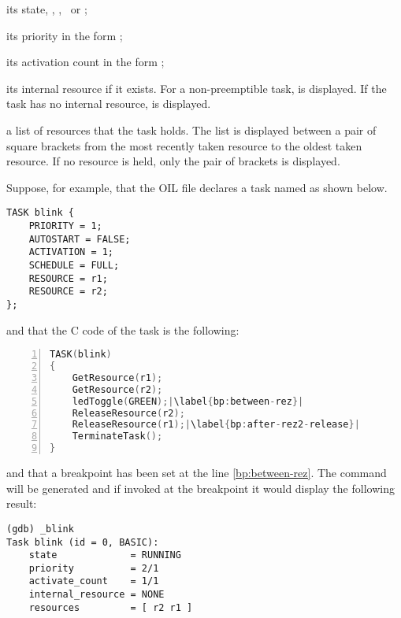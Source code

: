 \begin{pitemize}
\item its state, \SUSPENDED, \READY, \RUNNING\ or \WAITING;
\item its priority in the form ;
\item its activation count in the form ;
\item its internal resource if it exists. For a non-preemptible task,  is displayed. If the task has no internal resource,  is displayed.
\item a list of resources that the task holds. The list is displayed between a pair of square brackets from the most recently taken resource to the oldest taken resource. If no resource is held, only the pair of brackets is displayed. 
\end{pitemize}

Suppose, for example, that the OIL file declares a task named  as shown below.

\begin{lstlisting}[language=OIL]
TASK blink {
    PRIORITY = 1;
    AUTOSTART = FALSE;
    ACTIVATION = 1;
    SCHEDULE = FULL;
    RESOURCE = r1;
    RESOURCE = r2;
};
\end{lstlisting}

and that the C code of the task  is the following:

\begin{lstlisting}[language=C,escapechar=|,numbers=left]
TASK(blink)
{
    GetResource(r1);
    GetResource(r2);
    ledToggle(GREEN);|\label{bp:between-rez}|
    ReleaseResource(r2);
    ReleaseResource(r1);|\label{bp:after-rez2-release}|
    TerminateTask();
}
\end{lstlisting}
 
and that a breakpoint has been set at the line \ref{bp:between-rez}. The command  will be generated and if invoked at the breakpoint it would display the following result:

\begin{lstlisting}
(gdb) _blink 
Task blink (id = 0, BASIC):
	state             = RUNNING
	priority          = 2/1
	activate_count    = 1/1
	internal_resource = NONE
	resources         = [ r2 r1 ]
\end{lstlisting} 


